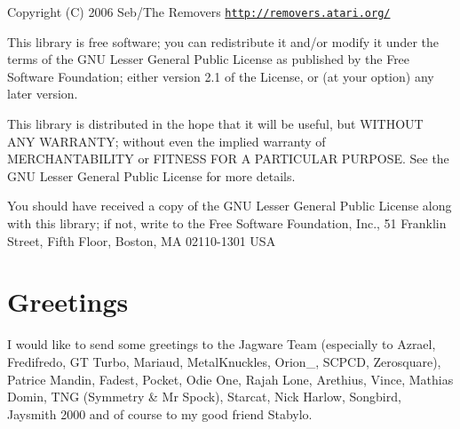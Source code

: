 Copyright (C) 2006 Seb/The Removers \href{http://removers.atari.org/}{\tt http://removers.atari.org/}

This library is free software; you can redistribute it and/or modify it under the terms of the GNU Lesser General Public License as published by the Free Software Foundation; either version 2.1 of the License, or (at your option) any later version.

This library is distributed in the hope that it will be useful, but WITHOUT ANY WARRANTY; without even the implied warranty of MERCHANTABILITY or FITNESS FOR A PARTICULAR PURPOSE. See the GNU Lesser General Public License for more details.

You should have received a copy of the GNU Lesser General Public License along with this library; if not, write to the Free Software Foundation, Inc., 51 Franklin Street, Fifth Floor, Boston, MA 02110-1301 USA\hypertarget{index_greet_sec}{}\section{Greetings}\label{index_greet_sec}
I would like to send some greetings to the Jagware Team (especially to Azrael, Fredifredo, GT Turbo, Mariaud, MetalKnuckles, Orion\_\-, SCPCD, Zerosquare), Patrice Mandin, Fadest, Pocket, Odie One, Rajah Lone, Arethius, Vince, Mathias Domin, TNG (Symmetry \& Mr Spock), Starcat, Nick Harlow, Songbird, Jaysmith 2000 and of course to my good friend Stabylo. 